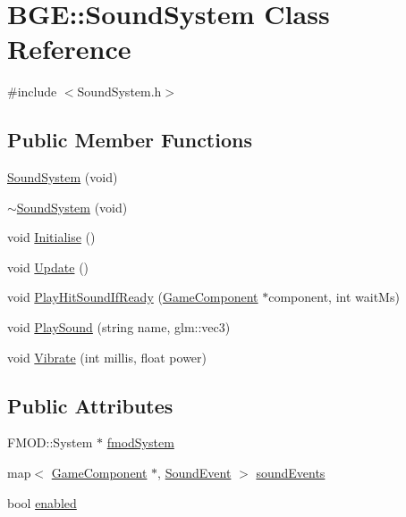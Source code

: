 \hypertarget{class_b_g_e_1_1_sound_system}{\section{B\-G\-E\-:\-:Sound\-System Class Reference}
\label{class_b_g_e_1_1_sound_system}
}


{\ttfamily \#include $<$Sound\-System.\-h$>$}

\subsection*{Public Member Functions}
\begin{DoxyCompactItemize}
\item 
\hyperlink{class_b_g_e_1_1_sound_system_a9e2ccfc4f53d94f8be363053a59603fd}{Sound\-System} (void)
\item 
\hyperlink{class_b_g_e_1_1_sound_system_ac5651672318708686b2581b73cac8e76}{$\sim$\-Sound\-System} (void)
\item 
void \hyperlink{class_b_g_e_1_1_sound_system_a7ec451812c10cdc7213cf245fe76d876}{Initialise} ()
\item 
void \hyperlink{class_b_g_e_1_1_sound_system_adf5931283a70db00abdc1e7b9451432e}{Update} ()
\item 
void \hyperlink{class_b_g_e_1_1_sound_system_a0ad428856d27e533b3fac3bcf5940c90}{Play\-Hit\-Sound\-If\-Ready} (\hyperlink{class_b_g_e_1_1_game_component}{Game\-Component} $\ast$component, int wait\-Ms)
\item 
void \hyperlink{class_b_g_e_1_1_sound_system_aa2824ec0ba2a4bfe8bb3b1a6734e05bd}{Play\-Sound} (string name, glm\-::vec3)
\item 
void \hyperlink{class_b_g_e_1_1_sound_system_a47e4e42c5cdbba414263037d59bd8fd0}{Vibrate} (int millis, float power)
\end{DoxyCompactItemize}
\subsection*{Public Attributes}
\begin{DoxyCompactItemize}
\item 
F\-M\-O\-D\-::\-System $\ast$ \hyperlink{class_b_g_e_1_1_sound_system_a28ab640f1afd14293ee5849f49cc31c4}{fmod\-System}
\item 
map$<$ \hyperlink{class_b_g_e_1_1_game_component}{Game\-Component} $\ast$, \hyperlink{struct_b_g_e_1_1_sound_event}{Sound\-Event} $>$ \hyperlink{class_b_g_e_1_1_sound_system_ab789315a3e959dcbdf57d742145d8f45}{sound\-Events}
\item 
bool \hyperlink{class_b_g_e_1_1_sound_system_aedde6ce3440f1ccc85e43461cce75f27}{enabled}
\end{DoxyCompactItemize}


